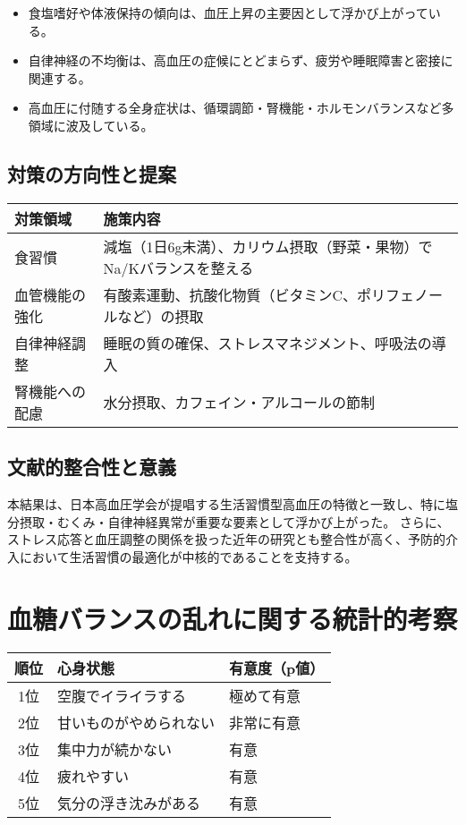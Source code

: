 \documentclass[a4paper,12pt]{article}
\begin{document}
\begin{itemize}
  \item 食塩嗜好や体液保持の傾向は、血圧上昇の主要因として浮かび上がっている。
  \item 自律神経の不均衡は、高血圧の症候にとどまらず、疲労や睡眠障害と密接に関連する。
  \item 高血圧に付随する全身症状は、循環調節・腎機能・ホルモンバランスなど多領域に波及している。
\end{itemize}

\subsection*{対策の方向性と提案}

\begin{table}[H]
\centering
\begin{tabular}{|l|p{10cm}|}
\hline
対策領域 & 施策内容 \\
\hline
食習慣 & 減塩（1日6g未満）、カリウム摂取（野菜・果物）でNa/Kバランスを整える \\
血管機能の強化 & 有酸素運動、抗酸化物質（ビタミンC、ポリフェノールなど）の摂取 \\
自律神経調整 & 睡眠の質の確保、ストレスマネジメント、呼吸法の導入 \\
腎機能への配慮 & 水分摂取、カフェイン・アルコールの節制 \\
\hline
\end{tabular}
\end{table}

\subsection*{文献的整合性と意義}

本結果は、日本高血圧学会が提唱する生活習慣型高血圧の特徴と一致し、特に塩分摂取・むくみ・自律神経異常が重要な要素として浮かび上がった。  
さらに、ストレス応答と血圧調整の関係を扱った近年の研究とも整合性が高く、予防的介入において生活習慣の最適化が中核的であることを支持する。


\section{血糖バランスの乱れに関する統計的考察}

\begin{table}[H]
\centering
\begin{tabular}{|c|l|l|}
\hline
順位 & 心身状態 & 有意度（p値） \\
\hline
1位 & 空腹でイライラする & 極めて有意 \\
2位 & 甘いものがやめられない & 非常に有意 \\
3位 & 集中力が続かない & 有意 \\
4位 & 疲れやすい & 有意 \\
5位 & 気分の浮き沈みがある & 有意 \\
\hline
\end{tabular}
\end{table}
\end{document}
